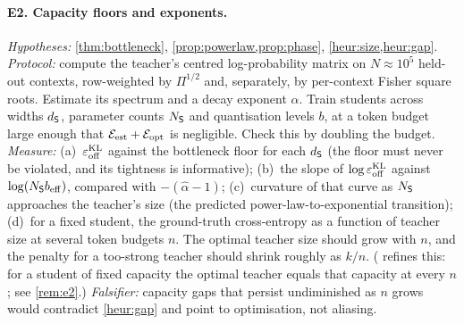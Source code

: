 \paragraph{E2. Capacity floors and exponents.}
\emph{Hypotheses:} \cref{thm:bottleneck}, \cref{prop:powerlaw,prop:phase}, \cref{heur:size,heur:gap}.
\emph{Protocol:} compute the teacher's centred log-probability matrix on $N\approx10^5$ held-out contexts,
row-weighted by $\Pi^{1/2}$ and, separately, by per-context Fisher square roots. Estimate its spectrum and
a decay exponent $\hat\alpha$. Train students across widths $d_{\mathsf{S}}$, parameter counts $N_{\mathsf{S}}$ and quantisation
levels $b$, at a token budget large enough that $\mathcal{E}_{\mathrm{est}}+\mathcal{E}_{\mathrm{opt}}$ is negligible. Check this by
doubling the budget.
\emph{Measure:} (a)~$\varepsilon_{\mathrm{off}}^{\mathrm{KL}}$ against the bottleneck floor for each $d_{\mathsf{S}}$ (the floor must never be
violated, and its tightness is informative); (b)~the slope of $\log\varepsilon_{\mathrm{off}}^{\mathrm{KL}}$ against $\log(N_{\mathsf{S}} b_{\mathrm{eff}})$,
compared with $-(\hat\alpha-1)$; (c)~curvature of that curve as $N_{\mathsf{S}}$ approaches the teacher's size (the
predicted power-law-to-exponential transition); (d)~for a fixed student, the ground-truth cross-entropy as a
function of teacher size at several token budgets $n$. The optimal teacher size should grow with $n$, and
the penalty for a too-strong teacher should shrink roughly as $k/n$. ( refines this: for a student of
fixed capacity the optimal teacher equals that capacity at every $n$; see \cref{rem:e2}.)
\emph{Falsifier:} capacity gaps that persist undiminished as $n$ grows would contradict \cref{heur:gap} and
point to optimisation, not aliasing.

